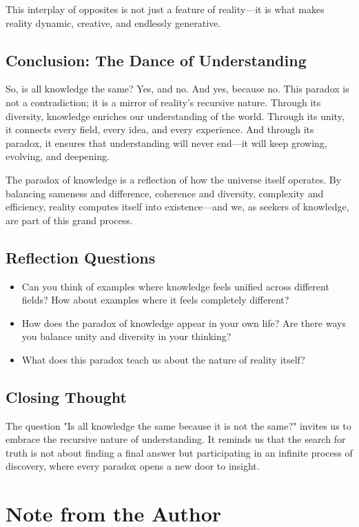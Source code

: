 \documentclass[12pt]{article}
\begin{document}
This interplay of opposites is not just a feature of reality—it is what makes reality dynamic, creative, and endlessly generative.

\subsection*{Conclusion: The Dance of Understanding}
So, is all knowledge the same? Yes, and no. And yes, because no. This paradox is not a contradiction; it is a mirror of reality's recursive nature. Through its diversity, knowledge enriches our understanding of the world. Through its unity, it connects every field, every idea, and every experience. And through its paradox, it ensures that understanding will never end—it will keep growing, evolving, and deepening.

The paradox of knowledge is a reflection of how the universe itself operates. By balancing sameness and difference, coherence and diversity, complexity and efficiency, reality computes itself into existence—and we, as seekers of knowledge, are part of this grand process.

\subsection*{Reflection Questions}
\begin{itemize}
    \item Can you think of examples where knowledge feels unified across different fields? How about examples where it feels completely different?
    \item How does the paradox of knowledge appear in your own life? Are there ways you balance unity and diversity in your thinking?
    \item What does this paradox teach us about the nature of reality itself?
\end{itemize}

\subsection*{Closing Thought}
The question "Is all knowledge the same because it is not the same?" invites us to embrace the recursive nature of understanding. It reminds us that the search for truth is not about finding a final answer but participating in an infinite process of discovery, where every paradox opens a new door to insight.


\section*{Note from the Author}
\end{document}
